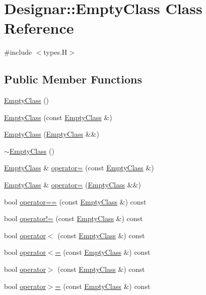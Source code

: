 \hypertarget{class_designar_1_1_empty_class}{}\section{Designar\+:\+:Empty\+Class Class Reference}
\label{class_designar_1_1_empty_class}


{\ttfamily \#include $<$types.\+H$>$}

\subsection*{Public Member Functions}
\begin{DoxyCompactItemize}
\item 
\hyperlink{class_designar_1_1_empty_class_a88d846866a1e4872224ec2b4e750eba8}{Empty\+Class} ()
\item 
\hyperlink{class_designar_1_1_empty_class_a0a0b2cec90aebb02e6f5e3371087b221}{Empty\+Class} (const \hyperlink{class_designar_1_1_empty_class}{Empty\+Class} \&)
\item 
\hyperlink{class_designar_1_1_empty_class_aa18e6ee1ae08bc9500c9c0f91a6bae0c}{Empty\+Class} (\hyperlink{class_designar_1_1_empty_class}{Empty\+Class} \&\&)
\item 
\hyperlink{class_designar_1_1_empty_class_a751a2dca8e5df75e3f6a528f4fa43656}{$\sim$\+Empty\+Class} ()
\item 
\hyperlink{class_designar_1_1_empty_class}{Empty\+Class} \& \hyperlink{class_designar_1_1_empty_class_ac40f40d89e1823d95f5441e037d4212a}{operator=} (const \hyperlink{class_designar_1_1_empty_class}{Empty\+Class} \&)
\item 
\hyperlink{class_designar_1_1_empty_class}{Empty\+Class} \& \hyperlink{class_designar_1_1_empty_class_a41efe51c730deccac172173c27e4f9a7}{operator=} (\hyperlink{class_designar_1_1_empty_class}{Empty\+Class} \&\&)
\item 
bool \hyperlink{class_designar_1_1_empty_class_a377d66a49a2eaa853dcf5d798f82499e}{operator==} (const \hyperlink{class_designar_1_1_empty_class}{Empty\+Class} \&) const
\item 
bool \hyperlink{class_designar_1_1_empty_class_aafdaf95265007ed710e7b2393921d805}{operator!=} (const \hyperlink{class_designar_1_1_empty_class}{Empty\+Class} \&) const
\item 
bool \hyperlink{class_designar_1_1_empty_class_ae08a3c7c6b6d1d8bd73a52bf4f7be4fb}{operator$<$} (const \hyperlink{class_designar_1_1_empty_class}{Empty\+Class} \&) const
\item 
bool \hyperlink{class_designar_1_1_empty_class_a92e2e8f4d9b8d7ac7b6f2295242dd447}{operator$<$=} (const \hyperlink{class_designar_1_1_empty_class}{Empty\+Class} \&) const
\item 
bool \hyperlink{class_designar_1_1_empty_class_a2c58de7cc499842e2de8497c4892359b}{operator$>$} (const \hyperlink{class_designar_1_1_empty_class}{Empty\+Class} \&) const
\item 
bool \hyperlink{class_designar_1_1_empty_class_a84209f056d1930a130d55e8a6de090d2}{operator$>$=} (const \hyperlink{class_designar_1_1_empty_class}{Empty\+Class} \&) const
\end{DoxyCompactItemize}
